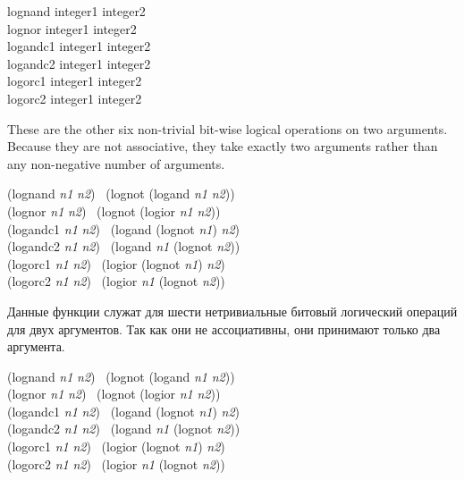 \begin{defun}[Function]
lognand integer1 integer2 \\
lognor integer1 integer2 \\
logandc1 integer1 integer2 \\
logandc2 integer1 integer2 \\
logorc1 integer1 integer2 \\
logorc2 integer1 integer2

These are the other six non-trivial bit-wise logical operations
on two arguments.  Because they are not associative,
they take exactly two arguments rather than any non-negative number
of arguments.
\begin{lisp}
(lognand \emph{n1} \emph{n2}) \EQ\ (lognot (logand \emph{n1} \emph{n2})) \\[2pt]
(lognor \emph{n1} \emph{n2}) \EQ\ (lognot (logior \emph{n1} \emph{n2})) \\[2pt]
(logandc1 \emph{n1} \emph{n2}) \EQ\ (logand (lognot \emph{n1}) \emph{n2}) \\[2pt]
(logandc2 \emph{n1} \emph{n2}) \EQ\ (logand \emph{n1} (lognot \emph{n2})) \\[2pt]
(logorc1 \emph{n1} \emph{n2}) \EQ\ (logior (lognot \emph{n1}) \emph{n2}) \\[2pt]
(logorc2 \emph{n1} \emph{n2}) \EQ\ (logior \emph{n1} (lognot \emph{n2}))
\end{lisp}

Данные функции служат для шести нетривиальные битовый логический операций для
двух аргументов. Так как они не ассоциативны, они принимают только два
аргумента.
\begin{lisp}
(lognand \emph{n1} \emph{n2}) \EQ\ (lognot (logand \emph{n1} \emph{n2})) \\[2pt]
(lognor \emph{n1} \emph{n2}) \EQ\ (lognot (logior \emph{n1} \emph{n2})) \\[2pt]
(logandc1 \emph{n1} \emph{n2}) \EQ\ (logand (lognot \emph{n1}) \emph{n2}) \\[2pt]
(logandc2 \emph{n1} \emph{n2}) \EQ\ (logand \emph{n1} (lognot \emph{n2})) \\[2pt]
(logorc1 \emph{n1} \emph{n2}) \EQ\ (logior (lognot \emph{n1}) \emph{n2}) \\[2pt]
(logorc2 \emph{n1} \emph{n2}) \EQ\ (logior \emph{n1} (lognot \emph{n2}))
\end{lisp}
\end{defun}

